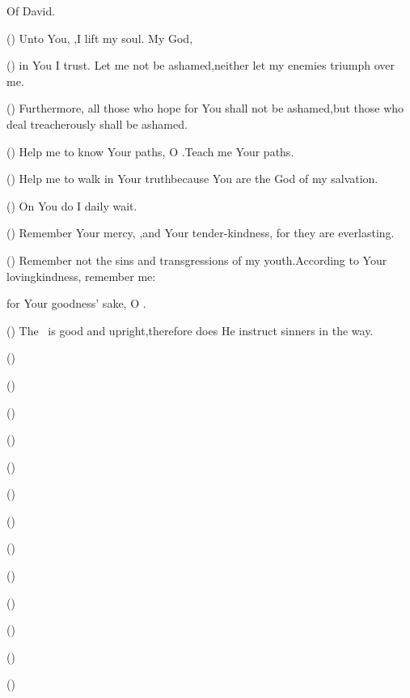 
\begin{inparaenum}
  \noindent{} Of David.\smallskip%

  \pb{}() Unto You, \lord,\pa{}I lift my soul.  My God,%

  \pb{}() in You I trust. Let me not be ashamed,\pa{}neither let my enemies triumph over me.%

  \pa{} () Furthermore, all those who hope for You shall not be ashamed,\pa{}but those who deal treacherously shall be ashamed.%

  \pa{} () Help me to know Your paths, O \lord.\pa{}Teach me Your paths.%

  \pa{} () Help me to walk in Your truth\pa{}because You are the God of my salvation.%

  \pb{}() On You do I daily wait.%

  \pa{} () Remember Your mercy, \lord,\pa{}and Your tender-kindness, for they are everlasting.%

  \pa{} () Remember not the sins and transgressions of my youth.\pa{}According to Your lovingkindness, remember me:%

  \pb{}for Your goodness' sake, O \lord.%

  \pa{} () The \lord\ is good and upright,\pa{}therefore does He instruct sinners in the way.%

  \pa{} () %

  \pa{} () %

  \pa{} () %

  \pa{} () %

  \pa{} () %

  \pa{} () %

  \pa{} () %

  \pa{} () %

  \pa{} () %

  \pa{} (\Hebrew{}) %

  \pa{} () %

  \pa{} () %

  \pa{} () %

  \pa{} %
\end{inparaenum}
